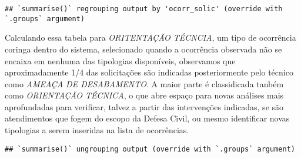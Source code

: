 \documentclass[
]{article}
\newenvironment{Shaded}{\begin{snugshade}}{\end{snugshade}}
\newcommand{\DataTypeTok}[1]{\textcolor[rgb]{0.13,0.29,0.53}{#1}}
\newcommand{\DecValTok}[1]{\textcolor[rgb]{0.00,0.00,0.81}{#1}}
\newcommand{\KeywordTok}[1]{\textcolor[rgb]{0.13,0.29,0.53}{\textbf{#1}}}
\newcommand{\NormalTok}[1]{#1}
\newcommand{\OperatorTok}[1]{\textcolor[rgb]{0.81,0.36,0.00}{\textbf{#1}}}
\newcommand{\StringTok}[1]{\textcolor[rgb]{0.31,0.60,0.02}{#1}}
\begin{document}
\begin{verbatim}
## `summarise()` regrouping output by 'ocorr_solic' (override with `.groups` argument)
\end{verbatim}

Calculando essa tabela para \emph{ORITENTAÇÃO TÉCNCIA}, um tipo de
ocorrência coringa dentro do sistema, selecionado quando a ocorrência
observada não se encaixa em nenhuma das tipologias disponíveis,
observamos que aproximadamente 1/4 das solicitações são indicadas
posteriormente pelo técnico como \emph{AMEAÇA DE DESABAMENTO}. A maior
parte é classidicada tanbém como \emph{ORIENTAÇÃO TÉCNICA}, o que abre
espaço para novas análises mais aprofundadas para verificar, talvez a
partir das intervenções indicadas, se são atendimentos que fogem do
escopo da Defesa Civil, ou mesmo identificar novas tipologias a serem
inseridas na lista de ocorrências.

\begin{Shaded}
\end{Shaded}

\begin{verbatim}
## `summarise()` ungrouping output (override with `.groups` argument)
\end{verbatim}
\end{document}
